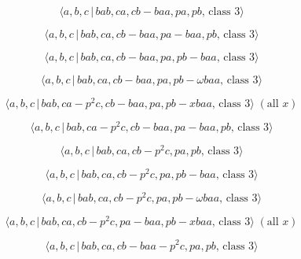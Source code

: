 \documentclass[10pt]{article}
\begin{document}
\begin{equation}
\langle a,b,c\,|\,bab,ca,cb-baa,pa,pb,\,\text{class }3\rangle  \tag{7.691}
\end{equation}

\begin{equation}
\langle a,b,c\,|\,bab,ca,cb-baa,pa-baa,pb,\,\text{class }3\rangle 
\tag{7.692}
\end{equation}

\begin{equation}
\langle a,b,c\,|\,bab,ca,cb-baa,pa,pb-baa,\,\text{class }3\rangle 
\tag{7.693}
\end{equation}

\begin{equation}
\langle a,b,c\,|\,bab,ca,cb-baa,pa,pb-\omega baa,\,\text{class }3\rangle 
\tag{7.694}
\end{equation}

\begin{equation}
\langle a,b,c\,|\,bab,ca-p^2c,cb-baa,pa,pb-xbaa,\,\text{class }3\rangle \;(%
\text{all }x)  \tag{7.695}
\end{equation}

\begin{equation}
\langle a,b,c\,|\,bab,ca-p^2c,cb-baa,pa-baa,pb,\,\text{class }3\rangle 
\tag{7.696}
\end{equation}

\begin{equation}
\langle a,b,c\,|\,bab,ca,cb-p^2c,pa,pb,\,\text{class }3\rangle  \tag{7.697}
\end{equation}

\begin{equation}
\langle a,b,c\,|\,bab,ca,cb-p^2c,pa,pb-baa,\,\text{class }3\rangle 
\tag{7.698}
\end{equation}

\begin{equation}
\langle a,b,c\,|\,bab,ca,cb-p^{2}c,pa,pb-\omega baa,\,\text{class }3\rangle 
\tag{7.699}
\end{equation}

\begin{equation}
\langle a,b,c\,|\,bab,ca,cb-p^2c,pa-baa,pb-xbaa,\,\text{class }3\rangle \;(%
\text{all }x)  \tag{7.700}
\end{equation}

\begin{equation}
\langle a,b,c\,|\,bab,ca,cb-baa-p^2c,pa,pb,\,\text{class }3\rangle 
\tag{7.701}
\end{equation}
\end{document}
